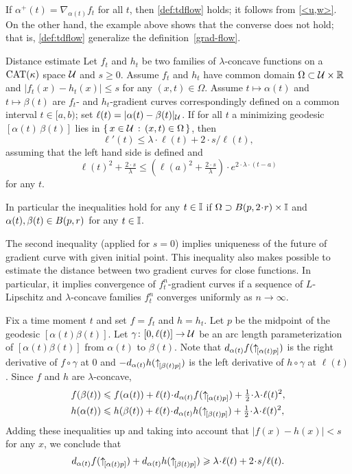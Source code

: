 \documentclass[oneside,a4paper, 12pt]{article}
\begin{document}
If $\alpha^+(t)=\nabla_{\alpha(t)}f_t$ for all $t$, then \ref{def:tdflow} holds;
it follows from \ref{<u,w>}.
On the other hand, the example above shows that the converse does not hold;
that is, \ref{def:tdflow} generalize the definition~\ref{grad-flow}.

\begin{thm}{Distance estimate}\label{Distance estimate}
Let $f_t$ and $h_t$ be two families of $\lambda$-concave functions on a $\mathrm{CAT}(\kappa)$ space $\mathcal{U}$ and $s\ge 0$.
Assume $f_t$ and $h_t$ have common domain $\Omega\subset {\mathcal{U}}\times \mathbb{R}$ and $|f_t(x)-h_t(x)|\le s$ for any $(x,t)\in \Omega$.
Assume $t\mapsto \alpha(t)$ and $t\mapsto \beta(t)$ are $f_t$- and $h_t$-gradient curves correspondingly defined on a common interval $t\in [a,b)$; set $\ell(t)\z=|\alpha(t)\z-\beta(t)|_{\spc{U}}$.
If for all $t$ a minimizing geodesic $[\alpha(t)\,\beta(t)]$ lies in $\{\,{x\in {\mathcal{U}}}\,:\,{(x,t)\in \Omega}\,\}$, then
\[\ell'(t)\le \lambda\cdot\ell(t)+2\cdot s/\ell(t),\]
assuming that the left hand side is defined and
\[\ell(t)^2+\tfrac{2\cdot s}\lambda\le(\ell(a)^2+\tfrac{2\cdot s}\lambda)\cdot e^{2\cdot\lambda\cdot (t-a)}\]
for any $t$.

In particular the inequalities hold for any $t\in\mathbb{I}$ if $\Omega\supset B(p,2\cdot r)\times \II$ and $\alpha(t),\beta(t)\z\in B(p, r)$ for any $t\in \mathbb{I}$.
\end{thm}

The second inequality (applied for $s=0$) implies uniqueness of the future of gradient curve with given initial point.
This inequality also makes possible to estimate the distance between two gradient curves for close functions.
In particular, it implies convergence of $f_t^n$-gradient curves if a sequence of $L$-Lipschitz and $\lambda$-concave families $f^n_t$ converges uniformly as $n\to \infty$. 

Fix a time moment $t$ and set $f=f_t$ and $h=h_t$.
Let $p$ be the midpoint of the geodesic $[\alpha(t)\beta(t)]$.
Let $\gamma\colon[0,\ell(t)]\to \mathcal{U}$ be an arc length parameterization of $[\alpha(t)\beta(t)]$ from $\alpha(t)$ to $\beta(t)$.
Note that $d_{\alpha(t)}f({\uparrow}_{\![{\alpha(t)}{p}]})$ is the right derivative of $f\circ\gamma$ at $0$
and $-d_{\alpha(t)}h({\uparrow}_{\![{\beta(t)}{p}]})$ is the left derivative of $h\circ\gamma$ at $\ell(t)$.
Since $f$ and $h$ are $\lambda$-concave,
\begin{align*}
f(\beta(t))&\le f(\alpha(t))+\ell(t)\cdot d_{\alpha(t)}f(\dir{\alpha(t)}{p}) +\tfrac12\cdot\lambda\cdot\ell(t)^2,
\\
h(\alpha(t))&\le h(\beta(t))+\ell(t)\cdot d_{\alpha(t)}h(\dir{\beta(t)}p) +\tfrac12\cdot\lambda\cdot\ell(t)^2,
\end{align*}
Adding these inequalities up and taking into account that $|f(x)-h(x)|<s$ for any $x$, we conclude that 
\[d_{\alpha(t)}f(\dir{\alpha(t)}{p})+d_{\alpha(t)}h(\dir{\beta(t)}p)\ge \lambda\cdot \ell(t)+2\cdot s/\ell(t).\]
\end{document}
